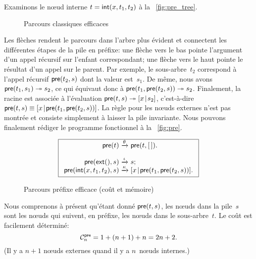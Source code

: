 Examinons le nœud interne \(t=\textsf{int}(x,t_1,t_2)\) à la
\fig~\vref{fig:pre_tree}.
\begin{figure}
\centering
{}
\caption{Parcours classiques efficaces}
\label{fig:classic_walks}
\end{figure}
Les flèches rendent le parcours dans l'arbre plus évident et
connectent les différentes étapes de la pile en préfixe: une flèche
vers le bas pointe l'argument d'un appel récursif sur l'enfant
correspondant; une flèche vers le haut pointe le résultat d'un appel
sur le parent. Par exemple, le sous-arbre~\(t_2\) correspond à l'appel
récursif \(\textsf{pre}(t_2,s)\) dont la valeur
est~\(s_1\).  De même, nous avons \(\textsf{pre}(t_1,s_1)
\twoheadrightarrow s_2\), ce qui équivaut donc à
\(\textsf{pre}(t_1,\textsf{pre}(t_2,s)) \twoheadrightarrow
s_2\). Finalement, la racine est associée à l'évaluation
\(\textsf{pre}(t,s) \twoheadrightarrow [{x}\!\mid\!{s_2}]\), c'est-à-dire
\(\textsf{pre}(t,s) \equiv
[{x}\!\mid\!{\textsf{pre}(t_1,\textsf{pre}(t_2,s))}]\). La
règle pour les nœuds externes n'est pas montrée et consiste
simplement à laisser la pile invariante. Nous pouvons finalement
rédiger le programme fonctionnel à la \fig~\vref{fig:pre}.
\begin{figure}
\begin{equation*}
\boxed{
\begin{array}{r@{\;}c@{\;}l}
\fun{pre}(t) & \xrightarrow{\smash{\theta}} & \fun{pre}(t,\el).\\
\\
\fun{pre}(\fun{ext}(),s) & \xrightarrow{\smash{\iota}} & s;\\
\fun{pre}(\fun{int}(x,t_1,t_2),s)
  & \xrightarrow{\smash{\kappa}}
  & \cons{x}{\fun{pre}(t_1,\fun{pre}(t_2,s))}.
\end{array}}
\end{equation*}
\caption{Parcours préfixe efficace (coût et mémoire)}
\label{fig:pre}
\end{figure}
Nous comprenons à présent qu'étant donné \(\textsf{pre}(t,s)\), les
nœuds dans la pile~\(s\) sont les nœuds qui suivent, en
préfixe, les nœuds dans le sous-arbre~\(t\). Le coût est
facilement déterminé:
\begin{equation}
\C{\fun{pre}}{n} = 1 + (n+1) + n = 2n+2.\label{eq:pre}
\index{pre@$\C{\fun{pre}}{n}$}
\end{equation}
(Il y a \(n+1\) nœuds externes quand il y a \(n\)~nœuds
internes.)

